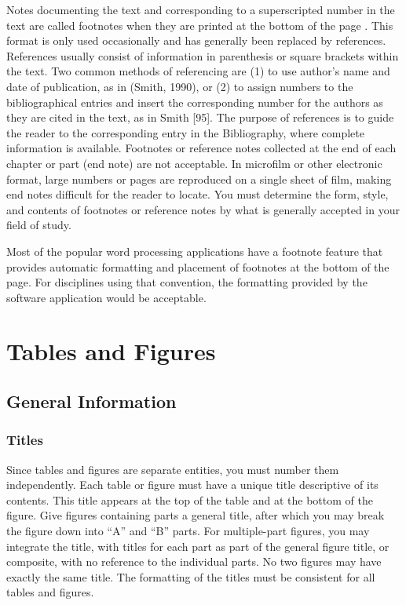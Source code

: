 Notes documenting the text and corresponding to a superscripted number
in the text are called footnotes when they are printed at the bottom
of the page \cite{chicago1982}. This format is only used occasionally
and has generally been replaced by references. References usually
consist of information in parenthesis or square brackets within the
text. Two common methods of referencing are (1) to use author's name
and date of publication, as in (Smith, 1990), or (2) to assign numbers
to the bibliographical entries and insert the corresponding number for
the authors as they are cited in the text, as in Smith [95]. The
purpose of references is to guide the reader to the corresponding
entry in the Bibliography, where complete information is available.
Footnotes or reference notes collected at the end of each chapter or
part (end note) are not acceptable. In microfilm or other electronic
format, large numbers or pages are reproduced on a single sheet of
film, making end notes difficult for the reader to locate. You must
determine the form, style, and contents of footnotes or reference
notes by what is generally accepted in your field of study.

Most of the popular word processing applications have a footnote
feature that provides automatic formatting and placement of footnotes
at the bottom of the page. For disciplines using that convention, the
formatting provided by the software application would be acceptable.

\section{Tables and Figures}
\label{sec:TablesAndFigures}

\subsection{General Information}
\label{sec:GeneralInformation}

\subsubsection{Titles}
\label{sec:Titles}

Since tables and figures are separate entities, you must number them
independently. Each table or figure must have a unique title
descriptive of its contents. This title appears at the top of the
table and at the bottom of the figure. Give figures containing parts a
general title, after which you may break the figure down into ``A''
and ``B'' parts. For multiple-part figures, you may integrate the
title, with titles for each part as part of the general figure title,
or composite, with no reference to the individual parts. No two
figures may have exactly the same title. The formatting of the titles
must be consistent for all tables and figures.

